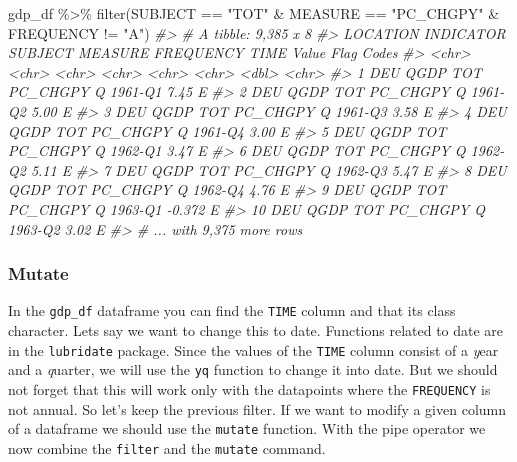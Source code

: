 \documentclass[
]{article}
\newenvironment{Shaded}{\begin{snugshade}}{\end{snugshade}}
\newcommand{\CommentTok}[1]{\textcolor[rgb]{0.56,0.35,0.01}{\textit{#1}}}
\newcommand{\FunctionTok}[1]{\textcolor[rgb]{0.00,0.00,0.00}{#1}}
\newcommand{\NormalTok}[1]{#1}
\newcommand{\SpecialCharTok}[1]{\textcolor[rgb]{0.00,0.00,0.00}{#1}}
\newcommand{\StringTok}[1]{\textcolor[rgb]{0.31,0.60,0.02}{#1}}
\begin{document}
\begin{Shaded}
\begin{Highlighting}[]
\NormalTok{gdp\_df }\SpecialCharTok{\%\textgreater{}\%} 
  \FunctionTok{filter}\NormalTok{(SUBJECT }\SpecialCharTok{==} \StringTok{"TOT"} \SpecialCharTok{\&}\NormalTok{ MEASURE }\SpecialCharTok{==} \StringTok{"PC\_CHGPY"} \SpecialCharTok{\&}\NormalTok{ FREQUENCY }\SpecialCharTok{!=} \StringTok{"A"}\NormalTok{)}
\CommentTok{\#\textgreater{} \# A tibble: 9,385 x 8}
\CommentTok{\#\textgreater{}    LOCATION INDICATOR SUBJECT MEASURE  FREQUENCY TIME     Value \textasciigrave{}Flag Codes\textasciigrave{}}
\CommentTok{\#\textgreater{}    \textless{}chr\textgreater{}    \textless{}chr\textgreater{}     \textless{}chr\textgreater{}   \textless{}chr\textgreater{}    \textless{}chr\textgreater{}     \textless{}chr\textgreater{}    \textless{}dbl\textgreater{} \textless{}chr\textgreater{}       }
\CommentTok{\#\textgreater{}  1 DEU      QGDP      TOT     PC\_CHGPY Q         1961{-}Q1  7.45  E           }
\CommentTok{\#\textgreater{}  2 DEU      QGDP      TOT     PC\_CHGPY Q         1961{-}Q2  5.00  E           }
\CommentTok{\#\textgreater{}  3 DEU      QGDP      TOT     PC\_CHGPY Q         1961{-}Q3  3.58  E           }
\CommentTok{\#\textgreater{}  4 DEU      QGDP      TOT     PC\_CHGPY Q         1961{-}Q4  3.00  E           }
\CommentTok{\#\textgreater{}  5 DEU      QGDP      TOT     PC\_CHGPY Q         1962{-}Q1  3.47  E           }
\CommentTok{\#\textgreater{}  6 DEU      QGDP      TOT     PC\_CHGPY Q         1962{-}Q2  5.11  E           }
\CommentTok{\#\textgreater{}  7 DEU      QGDP      TOT     PC\_CHGPY Q         1962{-}Q3  5.47  E           }
\CommentTok{\#\textgreater{}  8 DEU      QGDP      TOT     PC\_CHGPY Q         1962{-}Q4  4.76  E           }
\CommentTok{\#\textgreater{}  9 DEU      QGDP      TOT     PC\_CHGPY Q         1963{-}Q1 {-}0.372 E           }
\CommentTok{\#\textgreater{} 10 DEU      QGDP      TOT     PC\_CHGPY Q         1963{-}Q2  3.02  E           }
\CommentTok{\#\textgreater{} \# ... with 9,375 more rows}
\end{Highlighting}
\end{Shaded}

\hypertarget{mutate}{%
\subsubsection{Mutate}\label{mutate}}

In the \texttt{gdp\_df} dataframe you can find the \texttt{TIME} column and that its class character. Lets say we want to change this to date. Functions related to date are in the \texttt{lubridate} package. Since the values of the \texttt{TIME} column consist of a \emph{y}ear and a \emph{q}uarter, we will use the \texttt{yq} function to change it into date. But we should not forget that this will work only with the datapoints where the \texttt{FREQUENCY} is not annual. So let's keep the previous filter. If we want to modify a given column of a dataframe we should use the \texttt{mutate} function. With the pipe operator we now combine the \texttt{filter} and the \texttt{mutate} command.
\end{document}
